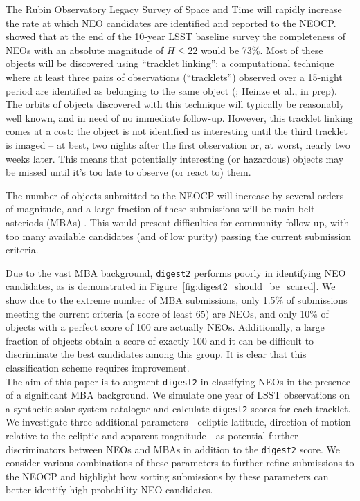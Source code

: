\documentclass[twocolumn, twocolappendix]{aastex631}
\newcommand{\dig}{\texttt{digest2}}
\begin{document}
The Rubin Observatory Legacy Survey of Space and Time \citep[LSST,][]{Ivezic+2019} will rapidly increase the rate at which NEO candidates are identified and reported to the NEOCP. \citet{Jones+2018} showed that at the end of the 10-year LSST baseline survey the completeness of NEOs with an absolute magnitude of $H \le 22$ would be 73\%. Most of these objects will be discovered using ``tracklet linking'': a computational technique where at least three pairs of observations (``tracklets'') observed over a 15-night period are identified as belonging to the same object (\citealp{Juric+2017}; Heinze et al., in prep). The orbits of objects discovered with this technique will typically be reasonably well known, and in need of no immediate follow-up. However, this tracklet linking comes at a cost: the object is not identified as interesting until the third tracklet is imaged -- at best, two nights after the first observation or, at worst, nearly two weeks later. This means that potentially interesting (or hazardous) objects may be missed until it's too late to observe (or react to) them.

The number of objects submitted to the NEOCP will increase by several orders of magnitude, and a large fraction of these submissions will be main belt asteriods (MBAs) \citep{sky-is-falling}. This would present difficulties for community follow-up, with too many available candidates (and of low purity) passing the current submission criteria.

Due to the vast MBA background, \dig{} performs poorly in identifying NEO candidates, as is demonstrated in Figure~\ref{fig:digest2_should_be_scared}. We show due to the extreme number of MBA submissions, only 1.5\% of submissions meeting the current criteria (a score of least 65) are NEOs, and only 10\% of objects with a perfect score of 100 are actually NEOs. Additionally, a large fraction of objects obtain a score of exactly 100 and it can be difficult to discriminate the best candidates among this group. It is clear that this classification scheme requires improvement.
\\

The aim of this paper is to augment \dig{} in classifying NEOs in the presence of a significant MBA background. We simulate one year of LSST observations on a synthetic solar system catalogue and calculate \dig{} scores for each tracklet. We investigate three additional parameters - ecliptic latitude, direction of motion relative to the ecliptic and apparent magnitude - as potential further discriminators between NEOs and MBAs in addition to the \dig{} score. We consider various combinations of these parameters to further refine submissions to the NEOCP and highlight how sorting submissions by these parameters can better identify high probability NEO candidates.
\end{document}
